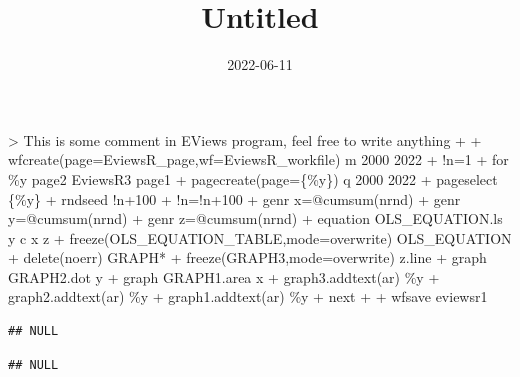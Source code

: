 \documentclass[
]{article}
\title{Untitled}
\author{}
\date{\vspace{-2.5em}2022-06-11}
\newenvironment{Shaded}{\begin{snugshade}}{\end{snugshade}}
\newcommand{\ErrorTok}[1]{\textcolor[rgb]{0.64,0.00,0.00}{\textbf{#1}}}
\newcommand{\FunctionTok}[1]{\textcolor[rgb]{0.00,0.00,0.00}{#1}}
\newcommand{\NormalTok}[1]{#1}
\newcommand{\SpecialCharTok}[1]{\textcolor[rgb]{0.00,0.00,0.00}{#1}}
\newcommand{\StringTok}[1]{\textcolor[rgb]{0.31,0.60,0.02}{#1}}
\begin{document}
\maketitle

{
\setcounter{tocdepth}{2}
\tableofcontents
}
\begin{Shaded}
\begin{Highlighting}[]
\NormalTok{\textgreater{} \textquotesingle{}This is some comment in EViews program, feel free to write anything}
\NormalTok{+ }
\NormalTok{+ wfcreate(page=EviewsR\_page,wf=EviewsR\_workfile) m 2000 2022}
\NormalTok{+ !n=1}
\NormalTok{+ for \%y  page2 EviewsR3 page1 }
\NormalTok{+ pagecreate(page=\{\%y\}) q 2000 2022}
\NormalTok{+ pageselect \{\%y\}}
\NormalTok{+ rndseed !n+100}
\NormalTok{+ !n=!n+100}
\NormalTok{+ genr x=@cumsum(nrnd)}
\NormalTok{+ genr y=@cumsum(nrnd)}
\NormalTok{+ genr z=@cumsum(nrnd)}
\NormalTok{+ equation OLS\_EQUATION.ls y c x z}
\NormalTok{+ freeze(OLS\_EQUATION\_TABLE,mode=overwrite) OLS\_EQUATION}
\NormalTok{+ delete(noerr) GRAPH*}
\NormalTok{+ freeze(GRAPH3,mode=overwrite) z.line}
\NormalTok{+ graph GRAPH2.dot y}
\NormalTok{+ graph GRAPH1.area x}
\NormalTok{+ graph3.addtext(ar) \%y}
\NormalTok{+ graph2.addtext(ar) \%y}
\NormalTok{+ graph1.addtext(ar) \%y}
\NormalTok{+ next}
\NormalTok{+ }
\NormalTok{+ wfsave eviewsr1}
\end{Highlighting}
\end{Shaded}

\begin{Shaded}
\end{Shaded}

\begin{verbatim}
## NULL
\end{verbatim}

\begin{Shaded}
\end{Shaded}

\begin{verbatim}
## NULL
\end{verbatim}
\end{document}
